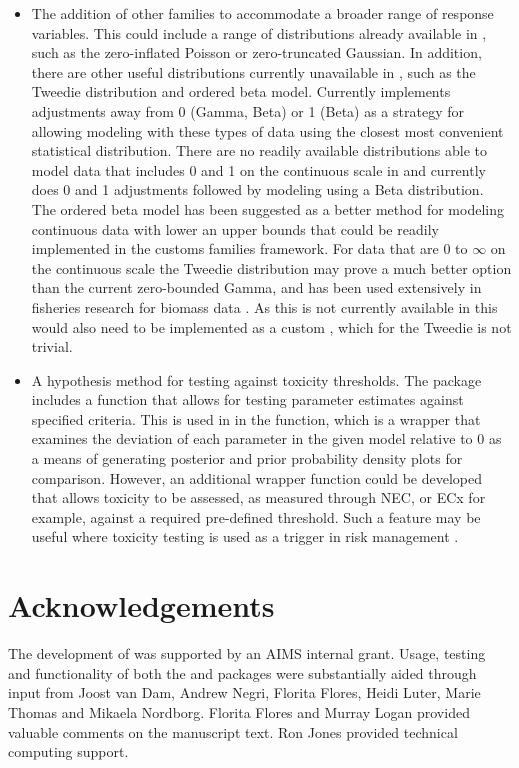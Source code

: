 \documentclass[
  shortnames]{jss}
\begin{document}
\begin{itemize}
\item
  The addition of other families to accommodate a broader range of response variables. This could include a range of distributions already available in , such as the zero-inflated Poisson or zero-truncated Gaussian. In addition, there are other useful distributions currently unavailable in , such as the Tweedie distribution and ordered beta model. Currently  implements adjustments away from 0 (Gamma, Beta) or 1 (Beta) as a strategy for allowing modeling with these types of data using the closest most convenient statistical distribution. There are no readily available distributions able to model data that includes 0 and 1 on the continuous scale in  and  currently does 0 and 1 adjustments followed by modeling using a Beta distribution. The ordered beta model has been suggested as a better method for modeling continuous data with lower an upper bounds \citep[see][]{Kubinec} that could be readily implemented in the  customs families framework. For data that are 0 to \(\infty\) on the continuous scale the Tweedie distribution may prove a much better option than the current zero-bounded Gamma, and has been used extensively in fisheries research for biomass data \citep{Shono2008}. As this  is not currently available in  this would also need to be implemented as a custom , which for the Tweedie is not trivial.
\item
  A hypothesis method for testing against toxicity thresholds. The  package includes a  function that allows for testing parameter estimates against specified criteria. This is used in  in the  function, which is a wrapper that examines the deviation of each parameter in the given model relative to 0 as a means of generating posterior and prior probability density plots for comparison. However, an additional wrapper function could be developed that allows toxicity to be assessed, as measured through NEC, or ECx for example, against a required pre-defined threshold. Such a feature may be useful where toxicity testing is used as a trigger in risk management \citep[for example, using whole-effluent-toxicity (WET) testing,][]{Karman2019}.
\end{itemize}

\hypertarget{acknowledgements}{%
\section{Acknowledgements}\label{acknowledgements}}

The development of  was supported by an AIMS internal grant. Usage, testing and functionality of both the  and  packages were substantially aided through input from Joost van Dam, Andrew Negri, Florita Flores, Heidi Luter, Marie Thomas and Mikaela Nordborg. Florita Flores and Murray Logan provided valuable comments on the manuscript text. Ron Jones provided technical computing support.

\renewcommand\refname{References}

\end{document}
